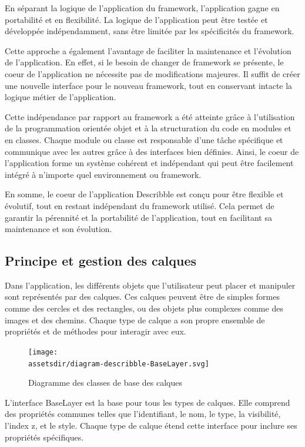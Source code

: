 En séparant la logique de l'application du framework, l'application gagne en portabilité et en flexibilité. La logique de l'application peut être testée et développée indépendamment, sans être limitée par les spécificités du framework.

Cette approche a également l'avantage de faciliter la maintenance et l'évolution de l'application. En effet, si le besoin de changer de framework se présente, le coeur de l'application ne nécessite pas de modifications majeures. Il suffit de créer une nouvelle interface pour le nouveau framework, tout en conservant intacte la logique métier de l'application.

Cette indépendance par rapport au framework a été atteinte grâce à l'utilisation de la programmation orientée objet et à la structuration du code en modules et en classes. Chaque module ou classe est responsable d'une tâche spécifique et communique avec les autres grâce à des interfaces bien définies. Ainsi, le coeur de l'application forme un système cohérent et indépendant qui peut être facilement intégré à n'importe quel environnement ou framework.

En somme, le coeur de l'application Describble est conçu pour être flexible et évolutif, tout en restant indépendant du framework utilisé. Cela permet de garantir la pérennité et la portabilité de l'application, tout en facilitant sa maintenance et son évolution.

\subsection{Principe et gestion des calques}

Dans l'application, les différents objets que l'utilisateur peut placer et manipuler sont représentés par des calques. Ces calques peuvent être de simples formes comme des cercles et des rectangles, ou des objets plus complexes comme des images et des chemins. Chaque type de calque a son propre ensemble de propriétés et de méthodes pour interagir avec eux.

\begin{figure}[h]
    \centering
    \texttt{[image: \\assetsdir/diagram-describble-BaseLayer.svg]}
    \caption{Diagramme des classes de base des calques}
    \label{fig:baseLayerDiagram}
\end{figure}

L'interface BaseLayer est la base pour tous les types de calques. Elle comprend des propriétés communes telles que l'identifiant, le nom, le type, la visibilité, l'index z, et le style. Chaque type de calque étend cette interface pour inclure ses propriétés spécifiques.

